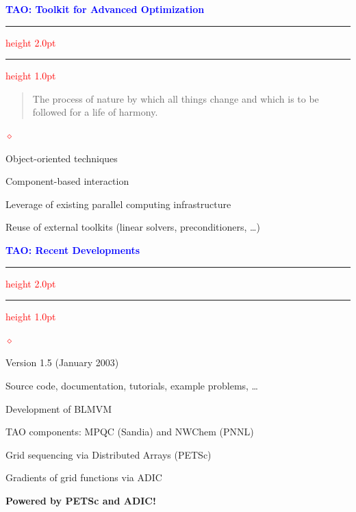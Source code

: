 \documentclass{seminar}
\newcommand{\reddiamond}{\textcolor{red}{$\diamond$}}
\newcommand{\redstripe}{\textcolor{red}{\hrule height 2.0pt\hfil}
             \vspace{-1.8pt}
             \textcolor{red}{\hrule height 1.0pt\hfil}
}
\newcommand{\heading}[1]{%
   \centerline{\textcolor{blue}{\textbf{#1}}}%
    \redstripe%
    \bigskip
}
\begin{document}
\begin{slide}

\heading{TAO: Toolkit for Advanced Optimization}

\begin{quote}
The process of nature by which all things change
and which is to be followed for a life of harmony.  
\end{quote}


\bigskip

\begin{list}{\reddiamond}{}
\item
Object-oriented techniques
\item
Component-based interaction
\item
Leverage of existing parallel computing infrastructure
\item
Reuse of external toolkits (linear solvers, preconditioners, \ldots)
\end{list}

\vfill

\end{slide}

\begin{slide}

\heading{TAO: Recent Developments}

\begin{list}{\reddiamond}{}
\item
Version 1.5 (January 2003)
\item
Source code, documentation, tutorials, 
example problems, \ldots
\item
Development of BLMVM
\item
TAO components: MPQC (Sandia) and NWChem (PNNL)
\item
Grid sequencing via Distributed Arrays (PETSc)
\item
Gradients of grid functions via ADIC
\end{list}

\bigskip

\textbf{Powered by PETSc and ADIC!}

\vfill

\end{slide}
\end{document}
